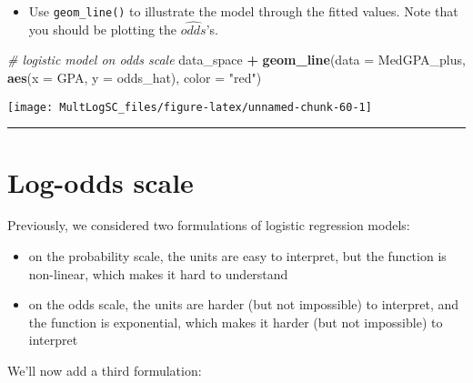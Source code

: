 \documentclass[
]{book}
\newenvironment{Shaded}{\begin{snugshade}}{\end{snugshade}}
\newcommand{\CommentTok}[1]{\textcolor[rgb]{0.56,0.35,0.01}{\textit{#1}}}
\newcommand{\DataTypeTok}[1]{\textcolor[rgb]{0.13,0.29,0.53}{#1}}
\newcommand{\KeywordTok}[1]{\textcolor[rgb]{0.13,0.29,0.53}{\textbf{#1}}}
\newcommand{\NormalTok}[1]{#1}
\newcommand{\OperatorTok}[1]{\textcolor[rgb]{0.81,0.36,0.00}{\textbf{#1}}}
\newcommand{\StringTok}[1]{\textcolor[rgb]{0.31,0.60,0.02}{#1}}
\providecommand{\tightlist}{%
  \setlength{\itemsep}{0pt}\setlength{\parskip}{0pt}}
\begin{document}
\begin{itemize}
\tightlist
\item
  Use \texttt{geom\_line()} to illustrate the model through the fitted values. Note that you should be plotting the \(\hat{odds}\)'s.
\end{itemize}

\begin{Shaded}
\begin{Highlighting}[]
\CommentTok{# logistic model on odds scale}
\NormalTok{data_space }\OperatorTok{+}
\StringTok{  }\KeywordTok{geom_line}\NormalTok{(}\DataTypeTok{data =}\NormalTok{ MedGPA_plus, }\KeywordTok{aes}\NormalTok{(}\DataTypeTok{x =}\NormalTok{ GPA, }\DataTypeTok{y =}\NormalTok{ odds_hat), }\DataTypeTok{color =} \StringTok{"red"}\NormalTok{)}
\end{Highlighting}
\end{Shaded}

\begin{center}\texttt{[image: MultLogSC\_files/figure-latex/unnamed-chunk-60-1]} \end{center}

\begin{center}\rule{0.5\linewidth}{0.5pt}\end{center}

\hypertarget{log-odds-scale}{%
\section{Log-odds scale}\label{log-odds-scale}}

Previously, we considered two formulations of logistic regression models:

\begin{itemize}
\item
  on the probability scale, the units are easy to interpret, but the function is non-linear, which makes it hard to understand
\item
  on the odds scale, the units are harder (but not impossible) to interpret, and the function is exponential, which makes it harder (but not impossible) to interpret
\end{itemize}

We'll now add a third formulation:
\end{document}
